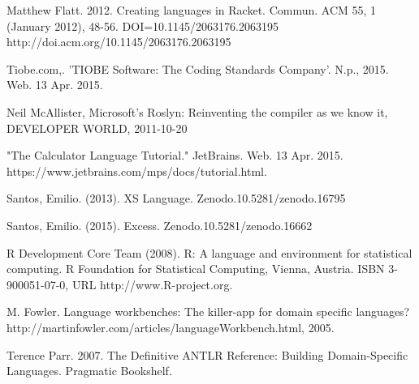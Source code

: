 \documentclass[conference]{IEEEtran}
\begin{document}
\begin{thebibliography}{1}
Matthew Flatt. 2012. Creating languages in Racket. Commun. ACM 55, 1 (January 2012), 48-56. DOI=10.1145/2063176.2063195 http://doi.acm.org/10.1145/2063176.2063195

Tiobe.com,. 'TIOBE Software: The Coding Standards Company'. N.p., 2015. Web. 13 Apr. 2015.

Neil McAllister, Microsoft's Roslyn: Reinventing the compiler as we know it, DEVELOPER WORLD, 2011-10-20

"The Calculator Language Tutorial." JetBrains. Web. 13 Apr. 2015. https://www.jetbrains.com/mps/docs/tutorial.html.

Santos, Emilio. (2013). XS Language. Zenodo.10.5281/zenodo.16795

Santos, Emilio. (2015). Excess. Zenodo.10.5281/zenodo.16662

R Development Core Team (2008). R: A language and environment for
  statistical computing. R Foundation for Statistical Computing,
  Vienna, Austria. ISBN 3-900051-07-0, URL http://www.R-project.org.

M. Fowler. Language workbenches: The killer-app for domain
specific languages? http://martinfowler.com/articles/languageWorkbench.html, 2005.

Terence Parr. 2007. The Definitive ANTLR Reference: Building Domain-Specific Languages. Pragmatic Bookshelf.


\end{thebibliography}




\end{document}
